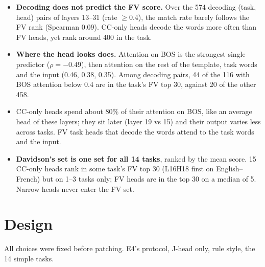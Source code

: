 \documentclass[10pt,a4paper]{article}
\begin{document}
\begin{itemize}
\item \textbf{Decoding does not predict the FV score.} Over the 574 decoding (task, head) pairs of layers 13--31 (rate $\geq$0.4), the match rate barely follows the FV rank (Spearman 0.09). CC-only heads decode the words more often than FV heads, yet rank around 400 in the task.
\item \textbf{Where the head looks does.} Attention on BOS is the strongest single predictor ($\rho = -0.49$), then attention on the rest of the template, task words and the input (0.46, 0.38, 0.35). Among decoding pairs, 44 of the 116 with BOS attention below 0.4 are in the task's FV top 30, against 20 of the other 458.
\item CC-only heads spend about 80\% of their attention on BOS, like an average head of these layers; they sit later (layer 19 vs 15) and their output varies less across tasks. FV task heads that decode the words attend to the task words and the input.
\item \textbf{Davidson's set is one set for all 14 tasks}, ranked by the mean score. 15 CC-only heads rank in some task's FV top 30 (L16H18 first on English--French) but on 1--3 tasks only; FV heads are in the top 30 on a median of 5. Narrow heads never enter the FV set.
\end{itemize}

\section{Design}

All choices were fixed before patching. E4's protocol, J-head only, rule style, the 14 simple tasks.
\end{document}
